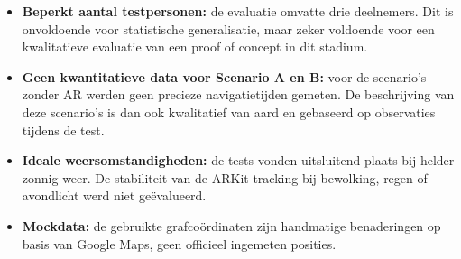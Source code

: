 \begin{itemize}
    \item \textbf{Beperkt aantal testpersonen:} de evaluatie omvatte drie
    deelnemers. Dit is onvoldoende voor statistische generalisatie, maar
    zeker voldoende voor een kwalitatieve evaluatie van een proof of concept in
    dit stadium.
    
    \item \textbf{Geen kwantitatieve data voor Scenario A en B:} voor de
    scenario's zonder AR werden geen precieze navigatietijden gemeten. De
    beschrijving van deze scenario's is dan ook kwalitatief van aard en
    gebaseerd op observaties tijdens de test.
    
    \item \textbf{Ideale weersomstandigheden:} de tests vonden uitsluitend
    plaats bij helder zonnig weer. De stabiliteit van de ARKit tracking bij
    bewolking, regen of avondlicht werd niet geëvalueerd. 
    
    \item \textbf{Mockdata:} de gebruikte grafcoördinaten zijn handmatige
    benaderingen op basis van Google Maps, geen officieel ingemeten posities.
\end{itemize}